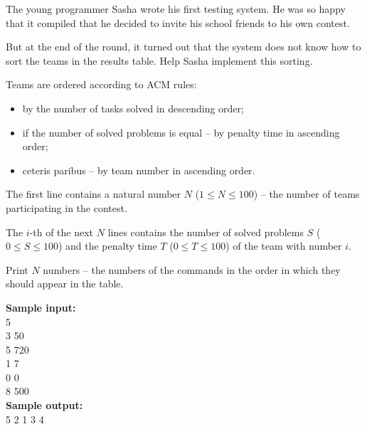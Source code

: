 \documentclass[a4paper]{article}
\begin{document}
The young programmer Sasha wrote his first testing system. He was so happy that it compiled that he decided to invite his school friends to his own contest.

But at the end of the round, it turned out that the system does not know how to sort the teams in the results table. Help Sasha implement this sorting.

Teams are ordered according to ACM rules:
\begin{itemize}
\item by the number of tasks solved in descending order;
\item if the number of solved problems is equal -- by penalty time in ascending order;
\item ceteris paribus -- by team number in ascending order.
\end{itemize}

The first line contains a natural number $N$ ($1 \le N \le 100$) -- the number of teams participating in the contest.

The $i$-th of the next $N$ lines contains the number of solved problems $S$ ($0 \le S \le 100$) and the penalty time $T$ ($0 \le T \le 100$) of the team with number $i$.

Print $N$ numbers -- the numbers of the commands in the order in which they should appear in the table.

\LINE

\noindent \textbf{Sample input:}\\
5\\
3 50\\
5 720\\
1 7\\
0 0\\
8 500\\


\noindent \textbf{Sample output:}\\
5 2 1 3 4
\end{document}
